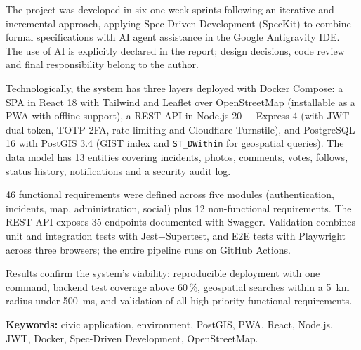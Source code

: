 The project was developed in six one-week sprints following an iterative and incremental approach, applying Spec-Driven Development (SpecKit) to combine formal specifications with AI agent assistance in the Google Antigravity IDE. The use of AI is explicitly declared in the report; design decisions, code review and final responsibility belong to the author.

Technologically, the system has three layers deployed with Docker Compose: a SPA in React 18 with Tailwind and Leaflet over OpenStreetMap (installable as a PWA with offline support), a REST API in Node.js 20 + Express 4 (with JWT dual token, TOTP 2FA, rate limiting and Cloudflare Turnstile), and PostgreSQL 16 with PostGIS 3.4 (GIST index and \texttt{ST\_DWithin} for geospatial queries). The data model has 13 entities covering incidents, photos, comments, votes, follows, status history, notifications and a security audit log.

46 functional requirements were defined across five modules (authentication, incidents, map, administration, social) plus 12 non-functional requirements. The REST API exposes 35 endpoints documented with Swagger. Validation combines unit and integration tests with Jest+Supertest, and E2E tests with Playwright across three browsers; the entire pipeline runs on GitHub Actions.

Results confirm the system's viability: reproducible deployment with one command, backend test coverage above 60\,\%, geospatial searches within a 5~km radius under 500~ms, and validation of all high-priority functional requirements.

\vspace{0.5cm}
\noindent\textbf{Keywords:} civic application, environment, PostGIS, PWA, React, Node.js, JWT, Docker, Spec-Driven Development, OpenStreetMap.

\clearpage
